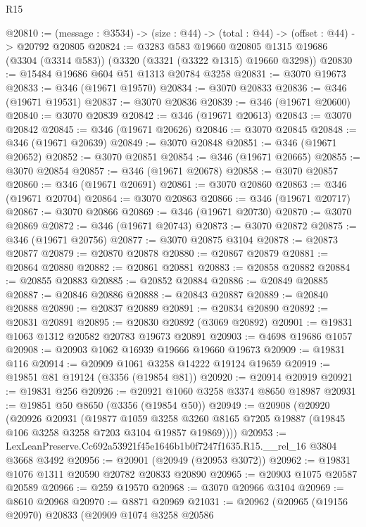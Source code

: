 \begin{lexlean}{R15}
\begin{coremodule}
@20810 := (message : @3534) -> (size : @44) -> (total : @44) -> (offset : @44) -> @20792 @20805
@20824 := @3283
    @583
    @19660
    @20805
    @1315
    @19686
    (@3304 (@3314 @583))
    (@3320 (@3321 (@3322 @1315) @19660 @3298))
@20830 := @15484 @19686 @604 @51 @1313 @20784 @3258
@20831 := @3070 @19673
@20833 := @346 (@19671 @19570)
@20834 := @3070 @20833
@20836 := @346 (@19671 @19531)
@20837 := @3070 @20836
@20839 := @346 (@19671 @20600)
@20840 := @3070 @20839
@20842 := @346 (@19671 @20613)
@20843 := @3070 @20842
@20845 := @346 (@19671 @20626)
@20846 := @3070 @20845
@20848 := @346 (@19671 @20639)
@20849 := @3070 @20848
@20851 := @346 (@19671 @20652)
@20852 := @3070 @20851
@20854 := @346 (@19671 @20665)
@20855 := @3070 @20854
@20857 := @346 (@19671 @20678)
@20858 := @3070 @20857
@20860 := @346 (@19671 @20691)
@20861 := @3070 @20860
@20863 := @346 (@19671 @20704)
@20864 := @3070 @20863
@20866 := @346 (@19671 @20717)
@20867 := @3070 @20866
@20869 := @346 (@19671 @20730)
@20870 := @3070 @20869
@20872 := @346 (@19671 @20743)
@20873 := @3070 @20872
@20875 := @346 (@19671 @20756)
@20877 := @3070 @20875 @3104
@20878 := @20873 @20877
@20879 := @20870 @20878
@20880 := @20867 @20879
@20881 := @20864 @20880
@20882 := @20861 @20881
@20883 := @20858 @20882
@20884 := @20855 @20883
@20885 := @20852 @20884
@20886 := @20849 @20885
@20887 := @20846 @20886
@20888 := @20843 @20887
@20889 := @20840 @20888
@20890 := @20837 @20889
@20891 := @20834 @20890
@20892 := @20831 @20891
@20895 := @20830 @20892 (@3069 @20892)
@20901 := @19831 @1063 @1312 @20582 @20783 @19673 @20891
@20903 := @4698 @19686 @1057
@20908 := @20903 @1062 @16939 @19666 @19660 @19673
@20909 := @19831 @116
@20914 := @20909 @1061 @3258 @14222 @19124 @19659
@20919 := @19851 @81 @19124 (@3356 (@19854 @81))
@20920 := @20914 @20919
@20921 := @19831 @256
@20926 := @20921 @1060 @3258 @3374 @8650 @18987
@20931 := @19851 @50 @8650 (@3356 (@19854 @50))
@20949 := @20908
    (@20920
      (@20926
        @20931
        (@19877
          @1059
          @3258
          @3260
          @8165
          @7205
          @19887
          (@19845 @106 @3258 @3258 @7203 @3104 @19857 @19869))))
@20953 := LexLeanPreserve.Cc692a53921f45e1646b1b0f7247f1635.R15.__rel_16 @3804 @3668 @3492
@20956 := @20901 (@20949 (@20953 @3072))
@20962 := @19831 @1076 @1311 @20590 @20782 @20833 @20890
@20965 := @20903 @1075 @20587 @20589
@20966 := @259 @19570
@20968 := @3070 @20966 @3104
@20969 := @8610 @20968
@20970 := @8871 @20969
@21031 := @20962
    (@20965
      (@19156 @20970)
      @20833
      (@20909
        @1074
        @3258
        @20586

\end{coremodule}
\end{lexlean}
